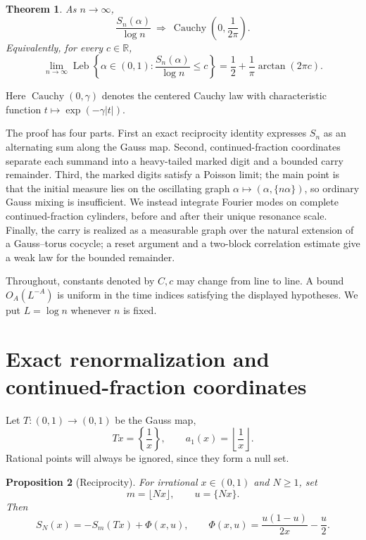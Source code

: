 \documentclass[11pt,a4paper]{amsart}
\newtheorem{theorem}{Theorem}[section]
\newtheorem{proposition}[theorem]{Proposition}
\theoremstyle{definition}
\theoremstyle{remark}
\newcommand{\R}{\mathbb R}
\newcommand{\Leb}{\operatorname{Leb}}
\begin{document}
\begin{theorem}\label{thm:main}
As $n\to\infty$,
\[
 \frac{S_n(\alpha)}{\log n}
 \ \Longrightarrow\
 \operatorname{Cauchy}\!\left(0,\frac1{2\pi}\right).
\]
Equivalently, for every $c\in\R$,
\[
 \lim_{n\to\infty}\Leb\left\{\alpha\in(0,1):
 \frac{S_n(\alpha)}{\log n}\le c\right\}
 =\frac12+\frac1\pi\arctan(2\pi c).
\]
\end{theorem}

Here $\operatorname{Cauchy}(0,\gamma)$ denotes the centered Cauchy law with
characteristic function $t\mapsto\exp(-\gamma|t|)$.

The proof has four parts.  First an exact reciprocity identity expresses
$S_n$ as an alternating sum along the Gauss map.  Second, continued-fraction
coordinates separate each summand into a heavy-tailed marked digit and a
bounded carry remainder.  Third, the marked digits satisfy a Poisson limit;
the main point is that the initial measure lies on the oscillating graph
$\alpha\mapsto(\alpha,\{n\alpha\})$, so ordinary Gauss mixing is insufficient.
We instead integrate Fourier modes on complete continued-fraction cylinders,
before and after their unique resonance scale.  Finally, the carry is realized
as a measurable graph over the natural extension of a Gauss--torus cocycle;
a reset argument and a two-block correlation estimate give a weak law for the
bounded remainder.

Throughout, constants denoted by $C,c$ may change from line to line.  A bound
$O_A(L^{-A})$ is uniform in the time indices satisfying the displayed
hypotheses.  We put $L=\log n$ whenever $n$ is fixed.

\section{Exact renormalization and continued-fraction coordinates}

Let $T:(0,1)\to(0,1)$ be the Gauss map,
\[
 Tx=\left\{\frac1x\right\},
 \qquad a_1(x)=\left\lfloor\frac1x\right\rfloor.
\]
Rational points will always be ignored, since they form a null set.

\begin{proposition}[Reciprocity]\label{prop:reciprocity}
For irrational $x\in(0,1)$ and $N\ge1$, set
\[
 m=\lfloor Nx\rfloor,\qquad u=\{Nx\}.
\]
Then
\begin{equation}\label{eq:reciprocity}
 S_N(x)=-S_m(Tx)+\Phi(x,u),
 \qquad
 \Phi(x,u)=\frac{u(1-u)}{2x}-\frac u2.
\end{equation}
\end{proposition}
\end{document}
